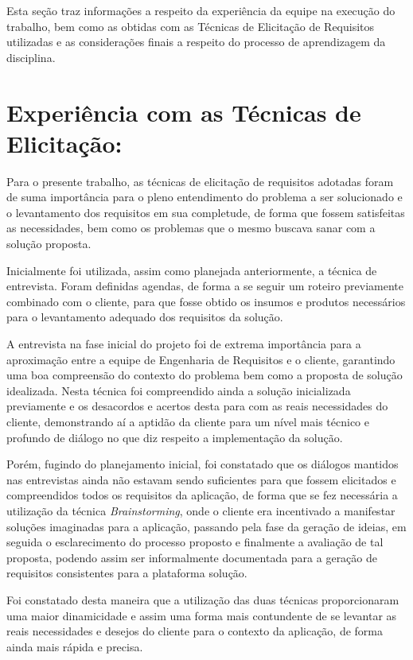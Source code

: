 Esta seção traz informações a respeito da experiência da equipe na execução do trabalho, bem como as obtidas com as Técnicas de Elicitação de Requisitos utilizadas e as considerações finais a respeito do processo de aprendizagem da disciplina.

\section{Experiência com as Técnicas de Elicitação:}

Para o presente trabalho, as técnicas de elicitação de requisitos adotadas foram de suma importância para o pleno entendimento do problema a ser solucionado e o levantamento dos requisitos em sua completude, de forma que fossem satisfeitas as necessidades, bem como os problemas que o mesmo buscava sanar com a solução proposta.

Inicialmente foi utilizada, assim como planejada anteriormente, a técnica de entrevista. Foram definidas agendas, de forma a se seguir um roteiro previamente combinado com o cliente, para que fosse obtido os insumos e produtos necessários para o levantamento adequado dos requisitos da solução.

A entrevista na fase inicial do projeto foi de extrema importância para a aproximação entre a equipe de Engenharia de Requisitos e o cliente, garantindo uma boa compreensão do contexto do problema bem como a proposta de solução idealizada. Nesta técnica foi compreendido ainda a solução inicializada previamente e os desacordos e acertos desta para com as reais necessidades do cliente, demonstrando aí a aptidão da cliente para um nível mais técnico e profundo de diálogo no que diz respeito a implementação da solução.

Porém, fugindo do planejamento inicial, foi constatado que os diálogos mantidos nas entrevistas ainda não estavam sendo suficientes para que fossem elicitados e compreendidos todos os requisitos da aplicação, de forma que se fez necessária a utilização da técnica \textit{Brainstorming}, onde o cliente era incentivado a manifestar soluções imaginadas para a aplicação, passando pela fase da geração de ideias, em seguida o esclarecimento do processo proposto e finalmente a avaliação de tal proposta, podendo assim ser informalmente documentada para a geração de requisitos consistentes para a plataforma solução.

Foi constatado desta maneira que a utilização das duas técnicas proporcionaram uma maior dinamicidade e assim uma forma mais contundente de se levantar as reais necessidades e desejos do cliente para o contexto da aplicação, de forma ainda mais rápida e precisa.
